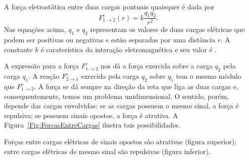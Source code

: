 A força eletrostática entre duas cargas pontuais quaisquer é dada por
\begin{equation}
    F_{1\to 2}^e(r) = k \frac{q_1 q_2}{r^2}.
\end{equation}
%
Nas equações acima, $q_1$ e $q_2$ representam os valores de duas cargas elétricas que podem ser positivas ou negativas e estão separadas por uma distância $r$. A constante $k$ é caraterística da interação eletromagnética e seu valor é .

A expressão para a força $F_{1\to 2}^e$ nos dá a força exercida sobre a carga $q_2$ pela carga $q_1$. A reação $F_{2\to 1}^e$ exercida pela carga $q_2$ sobre $q_1$ tem o mesmo módulo que $F_{1\to 2}^e$. A força se dá sempre na direção da reta que liga as duas cargas e, consequentemente, temos um problema unidimensional. O sentido, porém, depende das cargas envolvidas: se as cargas possuem o mesmo sinal, a força é repulsiva; se possuem sinais opostos, a força é atrativa. A Figura~\ref{Fig:ForcasEntreCargas} ilustra tais possibilidades.

\begin{marginfigure}
\centering
{}
\caption{Forças entre cargas elétricas de sinais opostos são atrativas (figura superior); entre cargas elétricas de mesmo sinal são repulsivas (figura inferior). \label{Fig:ForcasEntreCargas}}
\end{marginfigure}

